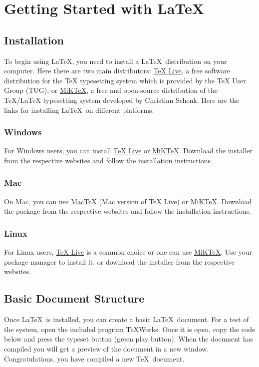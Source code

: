 \chapter{Getting Started with \LaTeX}
	\section{Installation}
		To begin using \LaTeX, you need to install a \LaTeX\ distribution on your computer.
		Here there are two main distributors: \href{https://tug.org/texlive}{TeX Live}, a free software distribution for the TeX typesetting system which is provided by the TeX User Group (TUG); or \href{https://miktex.org/}{MiKTeX}, a free and open-source distribution of the TeX/LaTeX typesetting system developed by Christian Schenk.
		Here are the links for installing \LaTeX\ on different platforms:

		\subsection{Windows}
			For Windows users, you can install \href{https://tug.org/texlive/windows.html}{TeX Live} or \href{https://miktex.org/download}{MiKTeX}. 
			Download the installer from the respective websites and follow the installation instructions.

		\subsection{Mac}
			On Mac, you can use \href{https://tug.org/mactex/}{MacTeX} (Mac version of TeX Live) or \href{https://miktex.org/download}{MiKTeX}. 
			Download the package from the respective websites and follow the installation instructions.

		\subsection{Linux}
			For Linux users, \href{https://tug.org/texlive/quickinstall.html}{TeX Live} is a common choice or one can use \href{https://miktex.org/download}{MiKTeX}. 
			Use your package manager to install it, or download the installer from the respective websites.

	\section{Basic Document Structure}
		Once \LaTeX\ is installed, you can create a basic \LaTeX\ document.
		For a test of the system, open the included program TeXWorks.
		Once it is open, copy the code below and press the typeset button (green play button).
		When the document has compiled you will get a preview of the document in a new window.
		Congratulations, you have compiled a new \TeX\ document.

